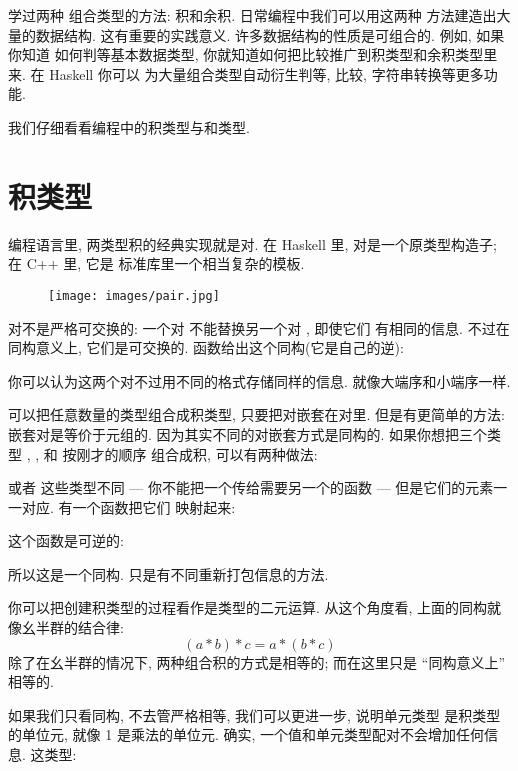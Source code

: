 
\lettrine[lhang=0.17]{学}{过两种} 组合类型的方法: 积和余积. 日常编程中我们可以用这两种
方法建造出大量的数据结构. 这有重要的实践意义. 许多数据结构的性质是可组合的. 例如, 如果你知道
如何判等基本数据类型, 你就知道如何把比较推广到积类型和余积类型里来. 在 Haskell 你可以
为大量组合类型自动衍生判等, 比较, 字符串转换等更多功能.

我们仔细看看编程中的积类型与和类型.

\section{积类型}

编程语言里, 两类型积的经典实现就是对. 在 Haskell 里, 对是一个原类型构造子; 在 C++ 里, 它是
标准库里一个相当复杂的模板.

\begin{figure}[H]
  \centering
  \texttt{[image: images/pair.jpg]}
\end{figure}

\noindent
对不是严格可交换的: 一个对  不能替换另一个对 , 即使它们
有相同的信息. 不过在同构意义上, 它们是可交换的.  函数给出这个同构(它是自己的逆):

你可以认为这两个对不过用不同的格式存储同样的信息. 就像大端序和小端序一样.

可以把任意数量的类型组合成积类型, 只要把对嵌套在对里. 但是有更简单的方法: 嵌套对是等价于元组的.
因为其实不同的对嵌套方式是同构的. 如果你想把三个类型 , , 和  按刚才的顺序
组合成积, 可以有两种做法:


或者
这些类型不同 --- 你不能把一个传给需要另一个的函数 --- 但是它们的元素一一对应. 有一个函数把它们
映射起来:

这个函数是可逆的:

所以这是一个同构. 只是有不同重新打包信息的方法.

你可以把创建积类型的过程看作是类型的二元运算. 从这个角度看, 上面的同构就像幺半群的结合律:
\[(a * b) * c = a * (b * c)\]
除了在幺半群的情况下, 两种组合积的方式是相等的; 而在这里只是 ``同构意义上'' 相等的.

如果我们只看同构, 不去管严格相等, 我们可以更进一步, 说明单元类型 \code{()} 是积类型的单位元,
就像 1 是乘法的单位元. 确实, 一个值和单元类型配对不会增加任何信息. 这类型:

